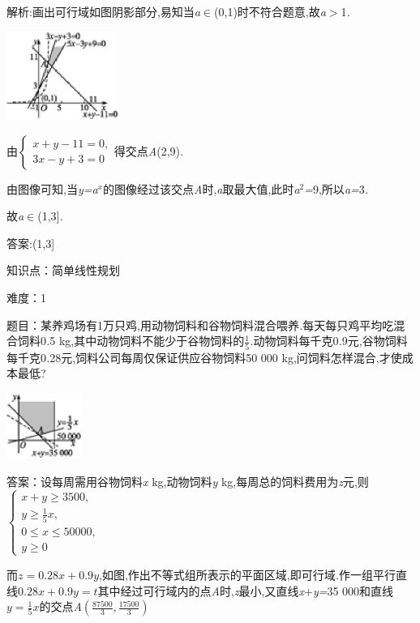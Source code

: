 \documentclass{article} %
\begin{document}
 解析:画出可行域如图阴影部分,易知当\textit{a}$\mathrm{\in}$(0,1)时不符合题意,故\textit{a$>$}1\textit{.}

 \includegraphics*[width=1.45in, height=1.14in, keepaspectratio=false]{image1719}

由$
\begin{cases}
x+y-11=0,\\
3x-y+3=0
\end{cases}$得交点\textit{A}(2,9)\textit{.}

由图像可知,当\textit{y=a${}^{x}$}的图像经过该交点\textit{A}时,\textit{a}取最大值,此时\textit{a}${}^{2}$\textit{=}9,所以\textit{a=}3\textit{.}

故\textit{a}$\mathrm{\in}$(1,3]\textit{.}

 答案:(1,3]

知识点：简单线性规划

难度：1

 题目：某养鸡场有1万只鸡,用动物饲料和谷物饲料混合喂养\textit{.}每天每只鸡平均吃混合饲料0\textit{.}5 kg,其中动物饲料不能少于谷物饲料的$\frac{1}{5}$\textit{.}动物饲料每千克0\textit{.}9元,谷物饲料每千克0\textit{.}28元,饲料公司每周仅保证供应谷物饲料50 000 kg,问饲料怎样混合,才使成本最低?

 \includegraphics*[width=0.97in, height=0.85in, keepaspectratio=false]{image1722}

 答案：设每周需用谷物饲料\textit{x} kg,动物饲料\textit{y} kg,每周总的饲料费用为\textit{z}元,则$
\begin{cases}
x+y \ge 3500,\\
y \ge \frac{1}{5}x,\\
0 \le x \le 50000,\\
y \ge 0
\end{cases}$

而$z=0.28x+0.9y$,如图,作出不等式组所表示的平面区域,即可行域\textit{.}作一组平行直线$0.28x+0.9y=t$其中经过可行域内的点\textit{A}时,\textit{z}最小,又直线\textit{x$+$y=}35 000和直线$y=\frac{1}{5}x$的交点\textit{A}$(\frac{87500}{3},\frac{17500}{3})$
\end{document}
